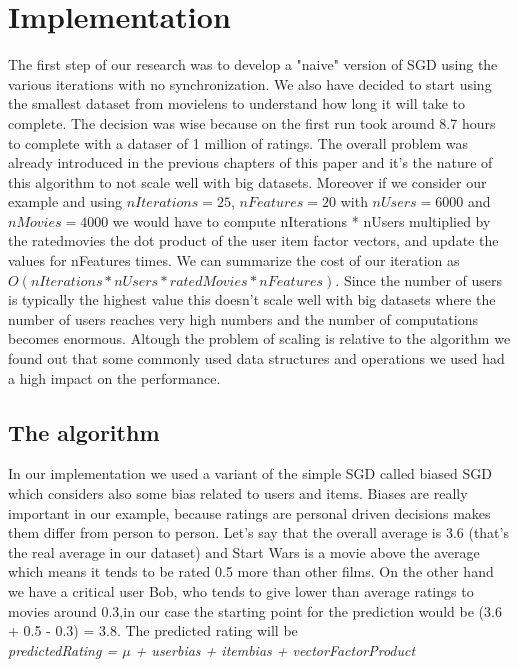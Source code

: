 \documentclass{sig-alternate-05-2015}
\begin{document}
\section{Implementation}
The first step of our research was to develop a "naive" version of
SGD using the various iterations with no synchronization. We also
have decided to start using the smallest dataset from movielens to understand
how long it will take to complete. The decision was wise because on the first
run took around 8.7 hours to complete with a dataser of 1 million of ratings.
The overall problem was already introduced in the previous chapters of this
paper and it's the nature of this algorithm to not scale well with big datasets.
Moreover if we consider our example and using $nIterations = 25$, $nFeatures = 20$
with $nUsers = 6000$ and $nMovies = 4000$ we would have to compute nIterations *
nUsers multiplied by the ratedmovies the dot product of the user item factor vectors, and update the values for
nFeatures times. We can summarize the cost of our iteration as $O(nIterations * nUsers * ratedMovies * nFeatures)$.
Since the number of users is typically the highest value this doesn't scale well with big datasets where the number of
users reaches very high numbers and the number of computations becomes enormous.
Altough the problem of scaling is relative to the algorithm we found out that
some commonly used data structures and operations we used had a high impact on
the performance.

\subsection{The algorithm}
In our implementation we used a variant of the simple SGD called biased SGD
which considers also some bias related to users and items.
Biases are really important in our example, because ratings are personal
driven decisions makes them differ from person to person. Let's say that
the overall average is 3.6 (that's the real average in our dataset) and
Start Wars is a movie above the average which means it tends to be rated
0.5 more than other films. On the other hand we have a critical user Bob,
who tends to give lower than average ratings to movies around 0.3,in our
case the starting point for the prediction would be (3.6 + 0.5 - 0.3) = 3.8.
The predicted rating will be\\
\textit{predictedRating = $\mu$ + userbias + itembias + vectorFactorProduct}
\end{document}
